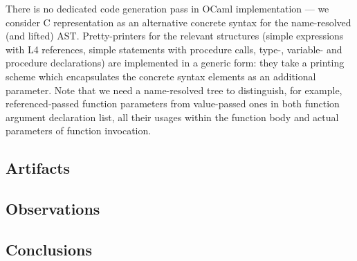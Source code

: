 There is no dedicated code generation pass in OCaml implementation --- we consider C representation
as an alternative concrete syntax for the name-resolved (and lifted) AST. Pretty-printers for the relevant
structures (simple expressions with L4 references, simple statements with procedure calls, 
type-, variable- and procedure declarations) are implemented in a generic form: they take a
printing scheme which encapsulates the concrete syntax elements as an additional
parameter. Note that we need a name-resolved tree to distinguish, for example, referenced-passed
function parameters from value-passed ones in both function argument declaration list, all
their usages within the function body and actual parameters of function invocation.

\subsection{Artifacts}

\subsection{Observations}

\subsection{Conclusions}
